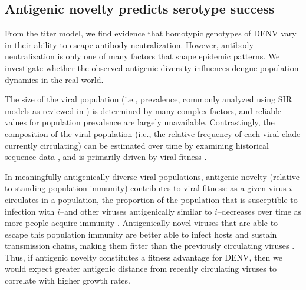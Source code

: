 \documentclass[11pt,oneside,letterpaper]{article}
\begin{document}
\subsection*{Antigenic novelty predicts serotype success}
From the titer model, we find evidence that homotypic genotypes of DENV vary in their ability to escape antibody neutralization.
However, antibody neutralization is only one of many factors that shape epidemic patterns.
We investigate whether the observed antigenic diversity influences dengue population dynamics in the real world.

The size of the viral population (i.e., prevalence, commonly analyzed using SIR models as reviewed in \citep{lourencco2018challenges}) is determined by many complex factors, and reliable values for population prevalence are largely unavailable.
Contrastingly, the composition of the viral population (i.e., the relative frequency of each viral clade currently circulating) can be estimated over time by examining historical sequence data \citep{lee2018deep,neher2016prediction}, and is primarily driven by viral fitness \citep{bedford2011strength}.

In meaningfully antigenically diverse viral populations, antigenic novelty (relative to standing population immunity) contributes to viral fitness: as a given virus $i$ circulates in a population, the proportion of the population that is susceptible to infection with $i$--and other viruses antigenically similar to $i$--decreases over time as more people acquire immunity \citep{bedford2012canalization, luksza2014predictive}.
Antigenically novel viruses that are able to escape this population immunity are better able to infect hosts and sustain transmission chains, making them fitter than the previously circulating viruses \citep{zhang2005clade, bedford2012canalization}.
Thus, if antigenic novelty constitutes a fitness advantage for DENV, then we would expect greater antigenic distance from recently circulating viruses to correlate with higher growth rates.
\end{document}
